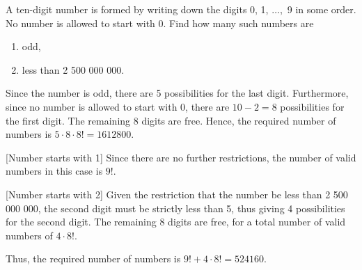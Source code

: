 \begin{problem}
    A ten-digit number is formed by writing down the digits 0, 1, $\ldots,$ 9 in some order. No number is allowed to start with 0. Find how many such numbers are
    \begin{enumerate}
        \item odd,
        \item less than 2 500 000 000.
    \end{enumerate}
\end{problem}
\begin{solution}
    \begin{ppart}
        Since the number is odd, there are 5 possibilities for the last digit. Furthermore, since no number is allowed to start with 0, there are $10 - 2 = 8$ possibilities for the first digit. The remaining 8 digits are free. Hence, the required number of numbers is $5 \cdot 8 \cdot 8! = 1612800$.
    \end{ppart}
    \begin{ppart}
        [Number starts with 1] Since there are no further restrictions, the number of valid numbers in this case is $9!$.

        [Number starts with 2] Given the restriction that the number be less than 2 500 000 000, the second digit must be strictly less than 5, thus giving 4 possibilities for the second digit. The remaining 8 digits are free, for a total number of valid numbers of $4 \cdot 8!$.

        Thus, the required number of numbers is $9! + 4 \cdot 8! = 524160$.
    \end{ppart}
\end{solution}

